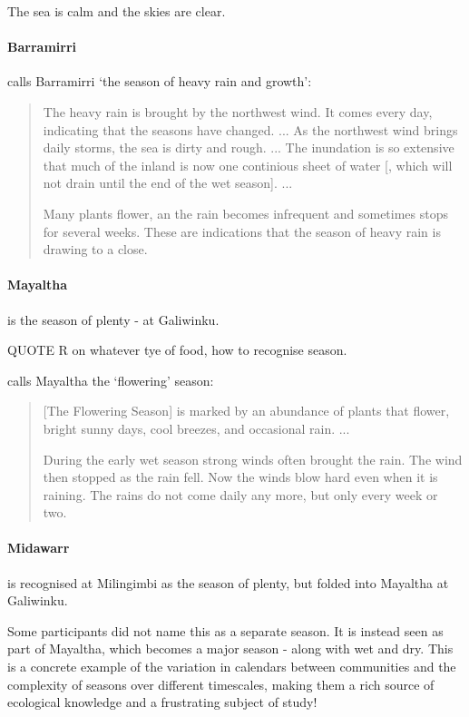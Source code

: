 The sea is calm and the skies are clear.


\paragraph{Barramirri}

\citet{davis1989} calls Barramirri `the season of heavy rain and growth':
\blockquote{
    The heavy rain is brought by the northwest wind. It comes every day, indicating that the seasons have changed. ...
    As the northwest wind brings daily storms, the sea is dirty and rough. ...
    The inundation is so extensive that much of the inland is now one continious sheet of water [, which will not drain until the end of the wet season]. ...
    
    Many plants flower, an the rain becomes infrequent and sometimes stops for several weeks.
    These are indications that the season of heavy rain is drawing to a close.
}


\paragraph{Mayaltha} is the season of plenty - at Galiwinku.  

QUOTE R on whatever tye of food, how to recognise season.

\citet{davis1989} calls Mayaltha the `flowering' season:
\blockquote{
    [The Flowering Season] is marked by an abundance of plants that flower, bright sunny days, cool breezes, and occasional rain. ...
    
    During the early wet season strong winds often brought the rain.
    The wind then stopped as the rain fell.
    Now the winds blow hard even when it is raining.
    The rains do not come daily any more, but only every week or two.
}


\paragraph{Midawarr} is recognised at Milingimbi as the season of plenty, but folded into Mayaltha at Galiwinku.

Some participants did not name this as a separate season.
It is instead seen as part of Mayaltha, which becomes a major season - along with wet and dry.
This is a concrete example of the variation in calendars between communities and the complexity of seasons over different timescales,
making them a rich source of ecological knowledge and a frustrating subject of study!

